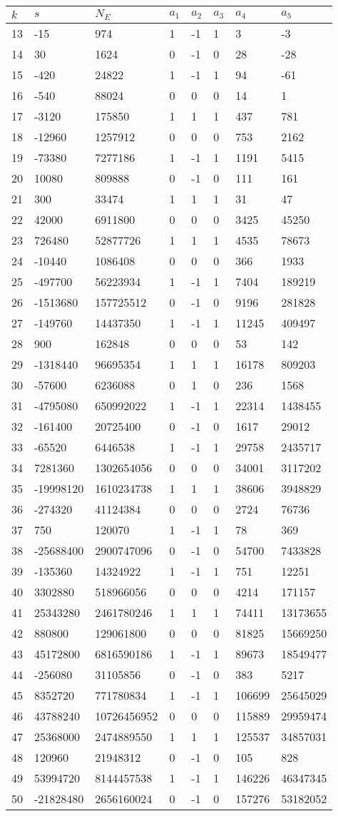 \documentclass{amsart}
\begin{document}
\begin{longtable}{|l|l|l|lllll|}
\hline
$k$ & $s$ & $N_E$ & $a_1$ & $a_2$ & $a_3$ & $a_4$ & $a_5$\\
\hline
13&-15&974&1&-1&1&3&-3\\
14&30&1624&0&-1&0&28&-28\\
15&-420&24822&1&-1&1&94&-61\\
16&-540&88024&0&0&0&14&1\\
17&-3120&175850&1&1&1&437&781\\
18&-12960&1257912&0&0&0&753&2162\\
19&-73380&7277186&1&-1&1&1191&5415\\
20&10080&809888&0&-1&0&111&161\\
21&300&33474&1&1&1&31&47\\
22&42000&6911800&0&0&0&3425&45250\\
23&726480&52877726&1&1&1&4535&78673\\
24&-10440&1086408&0&0&0&366&1933\\
25&-497700&56223934&1&-1&1&7404&189219\\
26&-1513680&157725512&0&-1&0&9196&281828\\
27&-149760&14437350&1&-1&1&11245&409497\\
28&900&162848&0&0&0&53&142\\
29&-1318440&96695354&1&1&1&16178&809203\\
30&-57600&6236088&0&1&0&236&1568\\
31&-4795080&650992022&1&-1&1&22314&1438455\\
32&-161400&20725400&0&-1&0&1617&29012\\
33&-65520&6446538&1&-1&1&29758&2435717\\
34&7281360&1302654056&0&0&0&34001&3117202\\
35&-19998120&1610234738&1&1&1&38606&3948829\\
36&-274320&41124384&0&0&0&2724&76736\\
37&750&120070&1&-1&1&78&369\\
38&-25688400&2900747096&0&-1&0&54700&7433828\\
39&-135360&14324922&1&-1&1&751&12251\\
40&3302880&518966056&0&0&0&4214&171157\\
41&25343280&2461780246&1&1&1&74411&13173655\\
42&880800&129061800&0&0&0&81825&15669250\\
43&45172800&6816590186&1&-1&1&89673&18549477\\
44&-256080&31105856&0&-1&0&383&5217\\
45&8352720&771780834&1&-1&1&106699&25645029\\
46&43788240&10726456952&0&0&0&115889&29959474\\
47&25368000&2474889550&1&1&1&125537&34857031\\
48&120960&21948312&0&-1&0&105&828\\
49&53994720&8144457538&1&-1&1&146226&46347345\\
50&-21828480&2656160024&0&-1&0&157276&53182052\\
\hline
\end{longtable}
\end{document}
